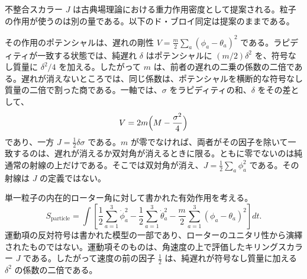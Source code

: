 \documentclass[a4paper]{article}
\begin{document}
不整合スカラー $J$ は古典場理論における重力作用密度として提案される。粒子の作用が使うのは別の量である。以下のド・ブロイ同定は提案のままである。

その作用のポテンシャルは、遅れの剛性 $V=\frac{m}{2}\sum_a(\phi_a-\theta_a)^2$ である。ラピディティが一致する状態では、純遅れ \(\delta\) はポテンシャルに \((m/2)\delta^2\) を、符号なし質量に \(\delta^2/4\) を加える。したがって \(m\) は、前者の遅れの二乗の係数の二倍である。遅れが消えないところでは、同じ係数は、ポテンシャルを横断的な符号なし質量の二倍で割った商である。一軸では、$\sigma$ をラピディティの和、$\delta$ をその差として、
\begin{equation}
\label{eq:stiffness-mass}
V=2m\Bigl(M-\frac{\sigma^2}{4}\Bigr)
\end{equation}
であり、一方 $J=\tfrac12\delta\sigma$ である。$m$ が零でなければ、両者がその因子を除いて一致するのは、遅れが消えるか双対角が消えるときに限る。ともに零でないのは純通常の射線の上だけである。そこでは双対角が消え、$J=\tfrac12\sum_a\phi_a^2$ である。その射線は $J$ の定義ではない。

単一粒子の内在的ローター角に対して書かれた有効作用を考える。
\[
S_{\text{particle}} = \int \left[ \frac{1}{2} \sum_{a=1}^3 \dot{\phi}_a^2 - \frac{1}{2} \sum_{a=1}^3 \dot{\theta}_a^2 - \frac{m}{2} \sum_{a=1}^3 (\phi_a - \theta_a)^2 \right] dt.
\]
運動項の反対符号は書かれた模型の一部であり、ローターのユニタリ性から演繹されたものではない。運動項そのものは、角速度の上で評価したキリングスカラー $J$ である。したがって速度の前の因子 \(\tfrac12\) は、純遅れが符号なし質量に加える \(\delta^2\) の係数の二倍である。
\end{document}
